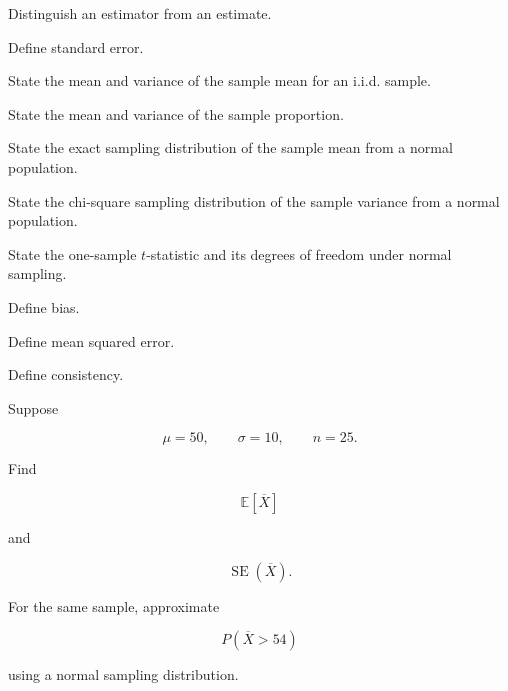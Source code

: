 \begin{exercise}[1]
Distinguish an estimator from an estimate.
\end{exercise}

\begin{exercise}[1]
Define standard error.
\end{exercise}

\begin{exercise}[1]
State the mean and variance of the sample mean for an i.i.d. sample.
\end{exercise}

\begin{exercise}[1]
State the mean and variance of the sample proportion.
\end{exercise}

\begin{exercise}[1]
State the exact sampling distribution of the sample mean from a normal
population.
\end{exercise}

\begin{exercise}[1]
State the chi-square sampling distribution of the sample variance from a
normal population.
\end{exercise}

\begin{exercise}[1]
State the one-sample \(t\)-statistic and its degrees of freedom under
normal sampling.
\end{exercise}

\begin{exercise}[1]
Define bias.
\end{exercise}

\begin{exercise}[1]
Define mean squared error.
\end{exercise}

\begin{exercise}[1]
Define consistency.
\end{exercise}

\begin{exercise}[2]
Suppose

\[
\mu=50,
\qquad
\sigma=10,
\qquad
n=25.
\]

Find

\[
\mathbb{E}[\overline{X}]
\]

and

\[
\operatorname{SE}(\overline{X}).
\]
\end{exercise}

\begin{exercise}[2]
For the same sample, approximate

\[
P(\overline{X}>54)
\]

using a normal sampling distribution.
\end{exercise}

